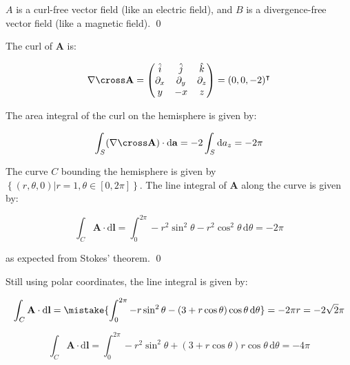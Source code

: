 \documentclass[12pt]{article}
\begin{document}
$A$ is a curl-free vector field (like an electric field), and $B$ is a divergence-free vector field (like a magnetic field).
\qed


The curl of $\mathbf{A}$ is:

\begin{equation}
    \nabla \cross \mathbf{A} = 
    \begin{pmatrix}
        \hat{i} & \hat{j} & \hat{k} \\
        \partial_{x} & \partial_{y} & \partial_{z} \\
        y & -x & z
    \end{pmatrix}
    =
    (0, 0, -2)^{\intercal}
\end{equation}

The area integral of the curl on the hemisphere is given by:

\begin{equation}
    \int_{S} (\nabla \cross \mathbf{A}) \cdot \mathrm{d}\mathbf{a} = -2\int_{S} \mathrm{d}a_{z} = -2\pi
\end{equation}

The curve $C$ bounding the hemisphere is given by $\left\{ (r, \theta, 0) \vert r = 1, \theta \in [0, 2\pi] \right\}$. The line integral of $\mathbf{A}$ along the curve is given by:

\begin{equation}
    \int_{C} \mathbf{A} \cdot \mathrm{d}\mathbf{l} = \int_{0}^{2\pi} -r^{2} \sin^{2}{\theta} - r^{2} \cos^{2}{\theta} \, \mathrm{d}\theta = -2\pi
\end{equation}

as expected from Stokes' theorem.
\qed


Still using polar coordinates, the line integral is given by:

\begin{equation}
    \int_{C} \mathbf{A} \cdot \mathrm{d}\mathbf{l} = \mistake{\int_{0}^{2\pi} -r \sin^{2}{\theta} - (3 + r\cos{\theta}) \cos{\theta} \, \mathrm{d}\theta} = -2\pi r = -2\sqrt{2} \pi
\end{equation}

\begin{correction}
    \begin{equation}
        \int_{C} \mathbf{A} \cdot \mathrm{d}\mathbf{l} = \int_{0}^{2\pi} -r^{2} \sin^{2}{\theta} + (3 + r\cos{\theta}) r \cos{\theta} \, \mathrm{d}\theta = -4\pi
    \end{equation}
\end{correction}
\end{document}
